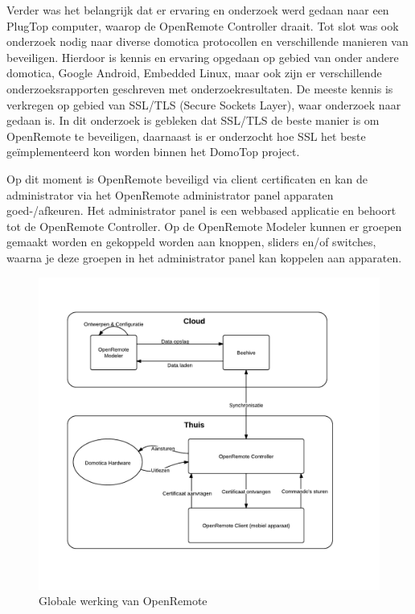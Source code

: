 \documentclass[]{article}
\begin{document}
Verder was het belangrijk dat er ervaring en onderzoek werd gedaan naar een PlugTop computer, waarop de OpenRemote Controller
draait. Tot slot was ook onderzoek nodig naar diverse domotica
protocollen en verschillende manieren van beveiligen. Hierdoor is kennis en
ervaring opgedaan op gebied van onder andere domotica, Google Android, Embedded
Linux, maar ook zijn er verschillende onderzoeksrapporten geschreven met
onderzoekresultaten. De meeste kennis is verkregen op gebied van SSL/TLS (Secure Sockets Layer),
waar onderzoek naar gedaan is. In dit onderzoek is gebleken dat SSL/TLS
de beste manier is om OpenRemote te beveiligen, daarnaast is er onderzocht hoe
SSL het beste ge\"implementeerd kon worden binnen het DomoTop project. 

Op dit moment is OpenRemote beveiligd via client certificaten en kan de
administrator via het OpenRemote administrator panel apparaten goed-/afkeuren.
Het administrator panel is een webbased applicatie en behoort tot de OpenRemote
Controller. Op de OpenRemote Modeler kunnen er groepen gemaakt worden en
gekoppeld worden aan knoppen, sliders en/of switches, waarna je deze groepen in
het administrator panel kan koppelen aan apparaten.

\newpage
\thispagestyle{empty}
\begin{figure}[htpb]
   \begin{center}
     \includegraphics[width=\textwidth]{GlobalOR.pdf}
   \end{center}
   \caption{Globale werking van OpenRemote}
   \label{global}
\end{figure}
\end{document}
